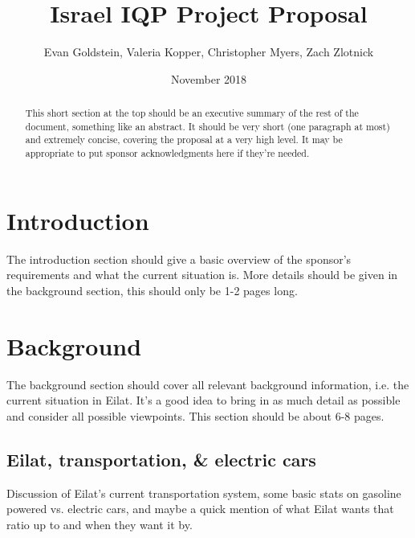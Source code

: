 \documentclass{article}
\title{Israel IQP Project Proposal}
\author{Evan Goldstein, Valeria Kopper, Christopher Myers, Zach Zlotnick}
\date{November 2018}
\begin{document}
\maketitle

\renewcommand\abstractname{Summary} %
\begin{abstract}
    \singlespacing
 This short section at the top should be an executive summary of the rest of the document, something like an abstract. It should be very short (one paragraph at most) and extremely concise, covering the proposal at a very high level. It may be appropriate to put sponsor acknowledgments here if they're needed.
\end{abstract}

\tableofcontents
\newpage
{}


\section{Introduction}

The introduction section should give a basic overview of the sponsor's requirements and what the current situation is. More details should be given in the background section, this should only be 1-2 pages long.

\newpage
\section{Background}

The background section should cover all relevant background information, i.e. the current situation in Eilat. It's a good idea to bring in as much detail as possible and consider all possible viewpoints. This section should be about 6-8 pages.

\subsection{Eilat, transportation, \& electric cars}
Discussion of Eilat's current transportation system, some basic stats on gasoline powered vs. electric cars, and maybe a quick mention of what Eilat wants that ratio up to and when they want it by.
\end{document}
